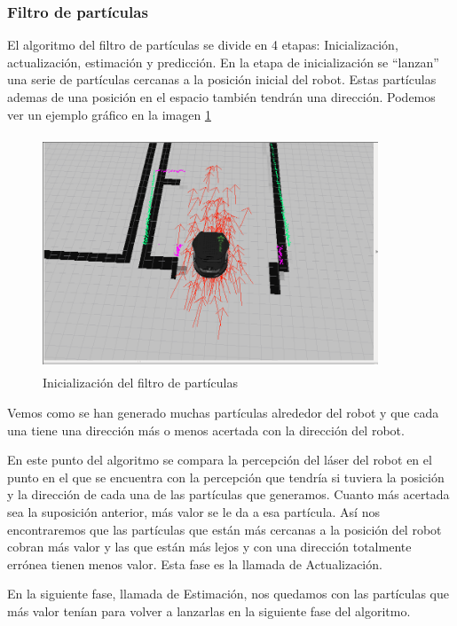 \subsubsection{Filtro de partículas}
El algoritmo del filtro de partículas se divide en 4 etapas: Inicialización, actualización, estimación y predicción. 
En la etapa de inicialización se ``lanzan'' una serie de partículas cercanas a la posición inicial del robot. Estas partículas ademas de una posición en el espacio también tendrán una dirección. Podemos ver un ejemplo gráfico en la imagen \ref{fig:initamcl}

\begin{figure}[hbtp]
  \begin{center}
    \includegraphics[width=10cm,height=7cm]{img/cap3/initamcl}
  \end{center}
  \caption{Inicialización del filtro de partículas}
  \label{fig:initamcl}
\end{figure}
Vemos como se han generado muchas partículas alrededor del robot y que cada una tiene una dirección más o menos acertada con la dirección del robot.

En este punto del algoritmo se compara la percepción del láser del robot en el punto en el que se encuentra con la percepción que tendría si tuviera la posición y la dirección de cada una de las partículas que generamos. Cuanto más acertada sea la suposición anterior, más valor se le da a esa partícula. Así nos encontraremos que las partículas que están más cercanas a la posición del robot cobran más valor y las que están más lejos y con una dirección totalmente errónea tienen menos valor. Esta fase es la llamada de Actualización. 

En la siguiente fase, llamada de Estimación, nos quedamos con las partículas que más valor tenían para volver a lanzarlas en la siguiente fase del algoritmo.

